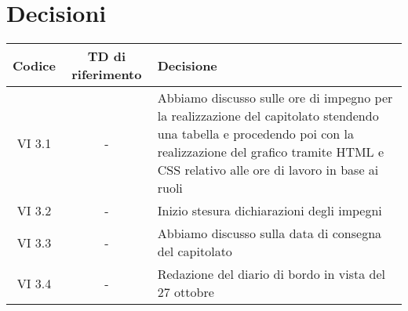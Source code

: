 \section{Decisioni}

	\begin{table}[htbp]
		\begin{tabular}{|c|c|p{}|}
			\hline
			\rowcolor[gray]{0.9}
			Codice & TD di riferimento & Decisione \\
			\hline
			VI 3.1 & - & Abbiamo discusso sulle ore di impegno per la realizzazione del capitolato stendendo una tabella e procedendo poi con la realizzazione del grafico tramite HTML e CSS relativo alle ore di lavoro in base ai ruoli\\
			\hline
			VI 3.2 & - & Inizio stesura dichiarazioni degli impegni \\
			\hline
			VI 3.3 & - &  Abbiamo discusso sulla data di consegna del capitolato\\
			\hline
			VI 3.4 & - &  Redazione del diario di bordo in vista del 27 ottobre\\
			\hline
		\end{tabular}
	\end{table}